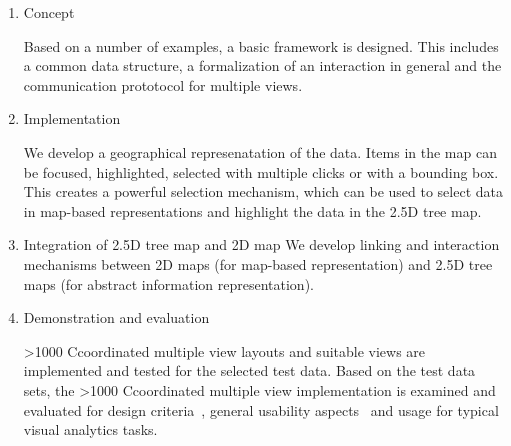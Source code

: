 \documentclass{article}
\newcommand\hmm[1]{\ifnum\ifhmode\spacefactor\else2000\fi>1000 \uppercase{#1}\else#1\fi}
\newcommand{\cmv}{\hmm{c}oordinated multiple view}
\newcommand{\map}{\textsc{2D} map}
\newcommand{\maps}{\textsc{2D} maps}
\newcommand{\tmap}{\textsc{2.5D} tree map}
\newcommand{\tmaps}{\textsc{2.5D} tree maps}
\begin{document}
\begin{enumerate}
  \item
    Concept

    Based on a number of examples, a basic framework is designed.
    This includes a common data structure, a formalization of an interaction in general and the communication prototocol for multiple views.

  \item
    Implementation

    We develop a geographical represenatation of the data.
    Items in the map can be focused, highlighted, selected with multiple clicks or with a bounding box.
    This creates a powerful selection mechanism, which can be used to select data in map-based representations and highlight the data in the \tmap{}.

  \item
    Integration of \tmap{} and \map{}
    We develop linking and interaction mechanisms between \maps{} (for map-based representation) and \tmaps{} (for abstract information representation).

  \item
    Demonstration and evaluation

    \cmv{} layouts and suitable views are implemented and tested for the selected test data.
    Based on the test data sets, the \cmv{} implementation is examined and evaluated for design criteria~\cite{Baldonado2000}, general usability aspects~\cite{Roberts2007} and usage for typical visual analytics tasks.
\end{enumerate}
\end{document}
